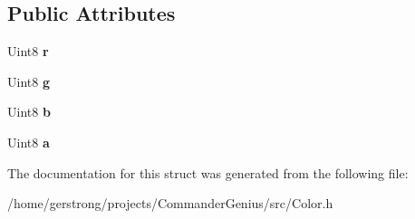 \subsection*{Public Attributes}
\begin{DoxyCompactItemize}
\item 
\hypertarget{struct_color_a7953638afd0a75b0eb837f47fc64bb0c}{
Uint8 {\bfseries r}}
\label{struct_color_a7953638afd0a75b0eb837f47fc64bb0c}

\item 
\hypertarget{struct_color_a3ecdd61478c70580cb1f31a6d5075afc}{
Uint8 {\bfseries g}}
\label{struct_color_a3ecdd61478c70580cb1f31a6d5075afc}

\item 
\hypertarget{struct_color_a010dfea24ef55827d62d1c02c74ba783}{
Uint8 {\bfseries b}}
\label{struct_color_a010dfea24ef55827d62d1c02c74ba783}

\item 
\hypertarget{struct_color_a999bf399ffcdc659430abbe5254bdd92}{
Uint8 {\bfseries a}}
\label{struct_color_a999bf399ffcdc659430abbe5254bdd92}

\end{DoxyCompactItemize}


The documentation for this struct was generated from the following file:\begin{DoxyCompactItemize}
\item 
/home/gerstrong/projects/CommanderGenius/src/Color.h\end{DoxyCompactItemize}
